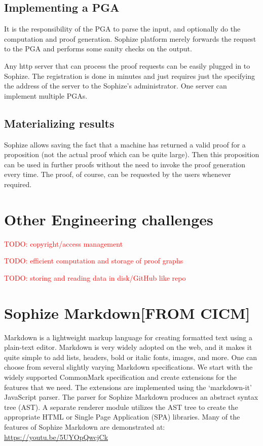 \documentclass[a4paper]{article}
\newcommand\todo[1]{\textcolor{red}{TODO: #1}}
\begin{document}
\subsection{Implementing a PGA}
It is the responsibility of the PGA to parse the input, and optionally do the computation and proof generation. Sophize platform merely forwards the request to the PGA and performs some sanity checks on the output.

Any http server that can process the proof requests can be easily plugged in to Sophize. The registration is done in minutes and just requires just the specifying the address of the server to the Sophize's administrator. One server can implement multiple PGAs.


\subsection{Materializing results}

Sophize allows saving the fact that a machine has returned a valid proof for a proposition (not the actual proof which can be quite large). Then this proposition can be used in further proofs without the need to invoke the proof generation every time. The proof, of course, can be requested by the users whenever required.


\section{Other Engineering challenges}
\todo{copyright/access management}

\todo{efficient computation and storage of proof graphs}

\todo{ storing and reading data in disk/GitHub like repo }


\section{Sophize Markdown[FROM CICM]}

Markdown is a lightweight markup language for creating formatted text using a plain-text editor. Markdown is very widely adopted on the web, and it makes it quite simple to add lists, headers, bold or italic fonts, images, and more. One can choose from several slightly varying Markdown specifications. We start with the widely supported CommonMark specification and create extensions for the features that we need. The extensions are implemented using the `markdown-it' \cite{markdown_it} JavaScript parser. The parser for Sophize Markdown produces an abstract syntax tree (AST). A separate renderer module utilizes the AST tree to create the appropriate HTML or Single Page Application (SPA) libraries. Many of the features of Sophize Markdown are demonstrated at: \url{https://youtu.be/5UYOpQwcjCk}
\end{document}
